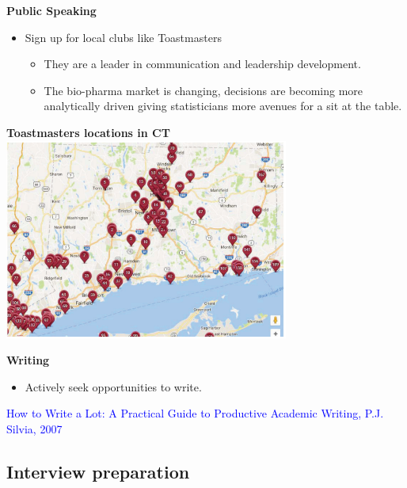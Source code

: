 \documentclass{beamer}
\begin{document}
\begin{frame}
	\center
	\textbf{Public Speaking}\\
	\bigskip
	\begin{itemize}
		\item  Sign up for local clubs like Toastmasters
		\pause
			\begin{itemize}
				\item They are a leader in communication and leadership	development.
				\pause
				\item The bio-pharma market is changing, decisions are becoming
				more analytically driven giving statisticians more avenues for a
				sit at the table.
			\end{itemize}
	\end{itemize}
\end{frame}

\begin{frame}
	\center
	\textbf{Toastmasters locations in CT}
	\includegraphics[width=0.70\textwidth]{toastmaster}
\end{frame}

\begin{frame}
	\center
	\textbf{Writing}\\
	\bigskip
	\begin{itemize}
		\item  Actively seek opportunities to write.
	\end{itemize}
	\pause
	\bigskip
	\textcolor{blue}{How to Write a Lot: A Practical Guide to Productive Academic
		Writing, P.J. Silvia, 2007}
\end{frame}

\subsection{Interview preparation}
	
\end{document}
